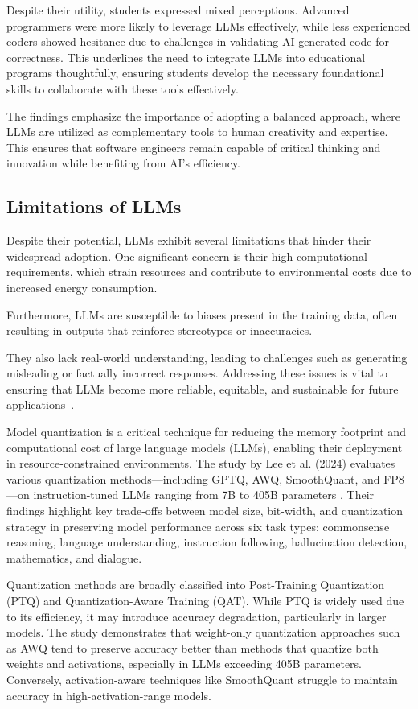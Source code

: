 Despite their utility, students expressed mixed perceptions. Advanced programmers were more likely to leverage LLMs effectively, while less experienced coders showed hesitance due to challenges in validating AI-generated code for correctness. This underlines the need to integrate LLMs into educational programs thoughtfully, ensuring students develop the necessary foundational skills to collaborate with these tools effectively.

The findings emphasize the importance of adopting a balanced approach, where LLMs are utilized as complementary tools to human creativity and expertise. This ensures that software engineers remain capable of critical thinking and innovation while benefiting from AI's efficiency.
\subsection{Limitations of LLMs}

Despite their potential, LLMs exhibit several limitations that hinder their widespread adoption. One significant concern is their high computational requirements, which strain resources and contribute to environmental costs due to increased energy consumption. 

Furthermore, LLMs are susceptible to biases present in the training data, often resulting in outputs that reinforce stereotypes or inaccuracies. 

They also lack real-world understanding, leading to challenges such as generating misleading or factually incorrect responses. Addressing these issues is vital to ensuring that LLMs become more reliable, equitable, and sustainable for future applications~\cite{limitations_llms}.

Model quantization is a critical technique for reducing the memory footprint and computational cost of large language models (LLMs), enabling their deployment in resource-constrained environments. The study by Lee et al. (2024) evaluates various quantization methods—including GPTQ, AWQ, SmoothQuant, and FP8—on instruction-tuned LLMs ranging from 7B to 405B parameters \cite{lee2024}. Their findings highlight key trade-offs between model size, bit-width, and quantization strategy in preserving model performance across six task types: commonsense reasoning, language understanding, instruction following, hallucination detection, mathematics, and dialogue.

Quantization methods are broadly classified into Post-Training Quantization (PTQ) and Quantization-Aware Training (QAT). While PTQ is widely used due to its efficiency, it may introduce accuracy degradation, particularly in larger models. The study demonstrates that weight-only quantization approaches such as AWQ tend to preserve accuracy better than methods that quantize both weights and activations, especially in LLMs exceeding 405B parameters. Conversely, activation-aware techniques like SmoothQuant struggle to maintain accuracy in high-activation-range models.

